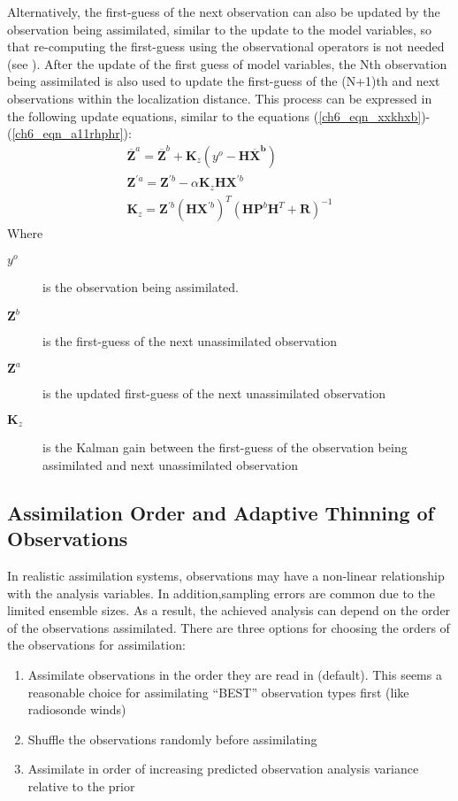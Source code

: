 Alternatively, the first-guess of the next observation can also be updated by the observation being assimilated, similar to the update to the model variables, so that re-computing the first-guess using the observational operators is not needed (see \cite{Anderson2007}). After the update of the first guess of model variables, the Nth observation being assimilated is also used to update the first-guess of the (N+1)th and next observations within the localization distance. This process can be expressed in the following update equations, similar to the equations (\ref{ch6_eqn_xxkhxb})-(\ref{ch6_eqn_a11rhphr}):
\begin{eqnarray}
\overline{\pmb{Z}}^a = \overline{\pmb{Z}}^b + \pmb{K}_{z} (y^o - \pmb{H\overline{X}^b} )  \label{ch6_eqn_zzkhx} \\
\pmb{Z}^{\prime a} = \pmb{Z}^{\prime b} - \alpha \pmb{K}_{z} \pmb{H} \pmb{X}^{\prime b}  \label{ch6_eqn_zzkhx2} \\
\pmb{K}_{z}  = \pmb{Z}^{\prime b} (\pmb{H} \pmb{X}^{\prime b})^{T} (\pmb{HP}^{b} \pmb{H}^T + \pmb{R} )^{-1} \label{ch6_eqn_kzhxhphr}
\end{eqnarray}
Where
\begin{description}
\item[$y^o$] is the observation being assimilated.
\item[$\pmb{Z}^b$] is the first-guess of the next unassimilated observation
\item[$\pmb{Z}^a$] is the updated first-guess of the next unassimilated observation
\item[$\pmb{K}_{z}$] is the Kalman gain between the first-guess of the observation being assimilated and
next unassimilated observation
\end{description}

   \subsection{Assimilation Order and Adaptive Thinning of Observations}
In realistic assimilation systems, observations may have a non-linear relationship with the analysis variables. In addition,sampling errors are common due to the limited ensemble sizes. As a result, the achieved analysis can depend on the order of the observations assimilated. There are three options for choosing the orders of the observations for assimilation:
\begin{enumerate}
\item Assimilate observations in the order they are read in (default). This seems a reasonable choice for assimilating ``BEST'' observation types first (like radiosonde winds)
\item Shuffle the observations randomly before assimilating
\item Assimilate in order of increasing predicted observation analysis variance relative to the prior
\end{enumerate}

